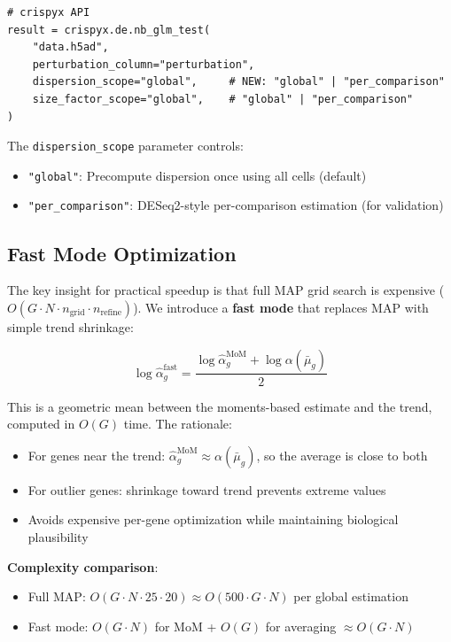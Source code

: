 \documentclass[11pt]{article}
\theoremstyle{definition}
\theoremstyle{remark}
\begin{document}
\begin{verbatim}
# crispyx API
result = crispyx.de.nb_glm_test(
    "data.h5ad",
    perturbation_column="perturbation",
    dispersion_scope="global",     # NEW: "global" | "per_comparison"
    size_factor_scope="global",    # "global" | "per_comparison"
)
\end{verbatim}

The \texttt{dispersion\_scope} parameter controls:
\begin{itemize}
    \item \texttt{"global"}: Precompute dispersion once using all cells (default)
    \item \texttt{"per\_comparison"}: DESeq2-style per-comparison estimation (for validation)
\end{itemize}

\subsection{Fast Mode Optimization}

The key insight for practical speedup is that full MAP grid search is expensive ($O(G \cdot N \cdot n_{\text{grid}} \cdot n_{\text{refine}})$). We introduce a \textbf{fast mode} that replaces MAP with simple trend shrinkage:

\begin{equation}
\log \hat{\alpha}_g^{\text{fast}} = \frac{\log \hat{\alpha}_g^{\text{MoM}} + \log \alpha(\bar{\mu}_g)}{2}
\end{equation}

This is a geometric mean between the moments-based estimate and the trend, computed in $O(G)$ time. The rationale:
\begin{itemize}
    \item For genes near the trend: $\hat{\alpha}_g^{\text{MoM}} \approx \alpha(\bar{\mu}_g)$, so the average is close to both
    \item For outlier genes: shrinkage toward trend prevents extreme values
    \item Avoids expensive per-gene optimization while maintaining biological plausibility
\end{itemize}

\textbf{Complexity comparison}:
\begin{itemize}
    \item Full MAP: $O(G \cdot N \cdot 25 \cdot 20) \approx O(500 \cdot G \cdot N)$ per global estimation
    \item Fast mode: $O(G \cdot N)$ for MoM + $O(G)$ for averaging $\approx O(G \cdot N)$
\end{itemize}
\end{document}
